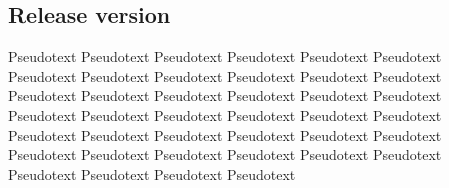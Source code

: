 \subsection{Release version}
\label{kap:AnzugReleaseversion}
Pseudotext Pseudotext Pseudotext Pseudotext Pseudotext Pseudotext Pseudotext Pseudotext Pseudotext Pseudotext Pseudotext Pseudotext Pseudotext Pseudotext Pseudotext Pseudotext Pseudotext Pseudotext Pseudotext Pseudotext Pseudotext Pseudotext Pseudotext Pseudotext Pseudotext Pseudotext Pseudotext Pseudotext Pseudotext Pseudotext Pseudotext Pseudotext Pseudotext Pseudotext Pseudotext Pseudotext Pseudotext Pseudotext Pseudotext Pseudotext 